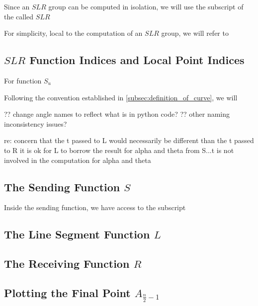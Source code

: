 \documentclass{article}
\begin{document}
Since an $SLR$ group can be computed in isolation, we will use the subscript of the called $SLR$

For simplicity, local to the computation of an $SLR$ group, we will refer to

\subsection{$SLR$ Function Indices and Local Point Indices}
For function $S_u$

Following the convention established in \ref{subsec:definition_of_curve}, we will

?? change angle names to reflect what is in python code?
?? other naming inconsistency issues?

re: concern that the t passed to L would necessarily be different than the t passed to R
it is ok for L to borrow the result for alpha and theta from S...t is not involved in the computation for alpha and theta

\subsection{The Sending Function $S$}
Inside the sending function, we have access to the subscript

\subsection{The Line Segment Function $L$}

\subsection{The Receiving Function $R$}

\subsection{Plotting the Final Point $A_{\frac{n}{2}-1}$}
\end{document}
